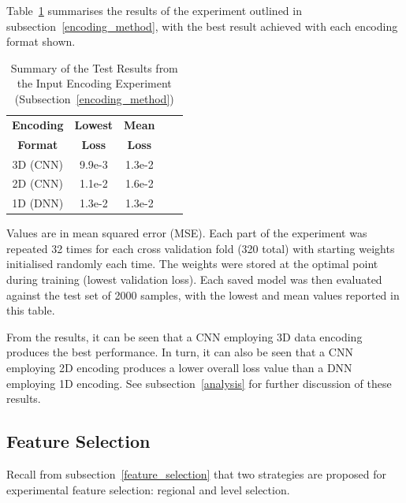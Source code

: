Table~\ref{tab:encoding} summarises the results of the experiment outlined in subsection~\ref{encoding_method}, with the best result achieved with each encoding format shown. \\

\begin{table}[h!]
	\begin{center}
		
		\begin{tabular}{c|c|c|r|c} %
			\textbf{Encoding} & \textbf{Lowest} & \textbf{Mean} \\
			
			\textbf{Format} & \textbf{Loss} & \textbf{Loss} \\
			\hline
			3D (CNN) & 9.9e-3  & 1.3e-2 \\
			2D (CNN) & 1.1e-2  & 1.6e-2 \\
			1D (DNN) & 1.3e-2 & 1.3e-2 \\
		\end{tabular}
		\caption{Summary of the Test Results from the Input Encoding Experiment (Subsection~\ref{encoding_method})} {Values are in mean squared error (MSE). Each part of the experiment was repeated 32 times for each cross validation fold (320 total) with starting weights initialised randomly each time. The weights were stored at the optimal point during training (lowest validation loss). Each saved model was then evaluated against the test set of 2000 samples, with the lowest and mean values reported in this table.}
		\label{tab:encoding}
	\end{center}
\end{table}

\noindent
From the results, it can be seen that a CNN employing 3D data encoding produces the best performance. In turn, it can also be seen that a CNN employing 2D encoding produces a lower overall loss value than a DNN employing 1D encoding. See subsection~\ref{analysis} for further discussion of these results. 

\subsection{Feature Selection} \label{feature_extract_results}

Recall from subsection~\ref{feature_selection} that two strategies are proposed for experimental feature selection: regional and level selection. 
\\

